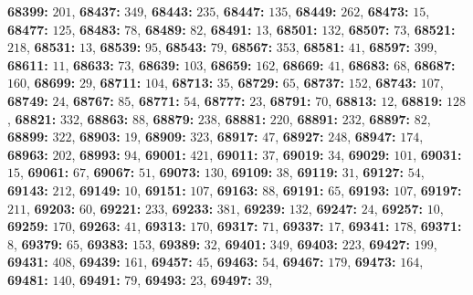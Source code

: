 \textsf{\bfseries 68399:} $201$, \textsf{\bfseries 68437:} $349$, \textsf{\bfseries 68443:} $235$, \textsf{\bfseries 68447:} $135$, \textsf{\bfseries 68449:} $262$, \textsf{\bfseries 68473:} $15$, \textsf{\bfseries 68477:} $125$, \textsf{\bfseries 68483:} $78$, \textsf{\bfseries 68489:} $82$, \textsf{\bfseries 68491:} $13$, \textsf{\bfseries 68501:} $132$, \textsf{\bfseries 68507:} $73$, \textsf{\bfseries 68521:} $218$, \textsf{\bfseries 68531:} $13$, \textsf{\bfseries 68539:} $95$, \textsf{\bfseries 68543:} $79$, \textsf{\bfseries 68567:} $353$, \textsf{\bfseries 68581:} $41$, \textsf{\bfseries 68597:} $399$, \textsf{\bfseries 68611:} $11$, \textsf{\bfseries 68633:} $73$, \textsf{\bfseries 68639:} $103$, \textsf{\bfseries 68659:} $162$, \textsf{\bfseries 68669:} $41$, \textsf{\bfseries 68683:} $68$, \textsf{\bfseries 68687:} $160$, \textsf{\bfseries 68699:} $29$, \textsf{\bfseries 68711:} $104$, \textsf{\bfseries 68713:} $35$, \textsf{\bfseries 68729:} $65$, \textsf{\bfseries 68737:} $152$, \textsf{\bfseries 68743:} $107$, \textsf{\bfseries 68749:} $24$, \textsf{\bfseries 68767:} $85$, \textsf{\bfseries 68771:} $54$, \textsf{\bfseries 68777:} $23$, \textsf{\bfseries 68791:} $70$, \textsf{\bfseries 68813:} $12$, \textsf{\bfseries 68819:} $128$, \textsf{\bfseries 68821:} $332$, \textsf{\bfseries 68863:} $88$, \textsf{\bfseries 68879:} $238$, \textsf{\bfseries 68881:} $220$, \textsf{\bfseries 68891:} $232$, \textsf{\bfseries 68897:} $82$, \textsf{\bfseries 68899:} $322$, \textsf{\bfseries 68903:} $19$, \textsf{\bfseries 68909:} $323$, \textsf{\bfseries 68917:} $47$, \textsf{\bfseries 68927:} $248$, \textsf{\bfseries 68947:} $174$, \textsf{\bfseries 68963:} $202$, \textsf{\bfseries 68993:} $94$, \textsf{\bfseries 69001:} $421$, \textsf{\bfseries 69011:} $37$, \textsf{\bfseries 69019:} $34$, \textsf{\bfseries 69029:} $101$, \textsf{\bfseries 69031:} $15$, \textsf{\bfseries 69061:} $67$, \textsf{\bfseries 69067:} $51$, \textsf{\bfseries 69073:} $130$, \textsf{\bfseries 69109:} $38$, \textsf{\bfseries 69119:} $31$, \textsf{\bfseries 69127:} $54$, \textsf{\bfseries 69143:} $212$, \textsf{\bfseries 69149:} $10$, \textsf{\bfseries 69151:} $107$, \textsf{\bfseries 69163:} $88$, \textsf{\bfseries 69191:} $65$, \textsf{\bfseries 69193:} $107$, \textsf{\bfseries 69197:} $211$, \textsf{\bfseries 69203:} $60$, \textsf{\bfseries 69221:} $233$, \textsf{\bfseries 69233:} $381$, \textsf{\bfseries 69239:} $132$, \textsf{\bfseries 69247:} $24$, \textsf{\bfseries 69257:} $10$, \textsf{\bfseries 69259:} $170$, \textsf{\bfseries 69263:} $41$, \textsf{\bfseries 69313:} $170$, \textsf{\bfseries 69317:} $71$, \textsf{\bfseries 69337:} $17$, \textsf{\bfseries 69341:} $178$, \textsf{\bfseries 69371:} $8$, \textsf{\bfseries 69379:} $65$, \textsf{\bfseries 69383:} $153$, \textsf{\bfseries 69389:} $32$, \textsf{\bfseries 69401:} $349$, \textsf{\bfseries 69403:} $223$, \textsf{\bfseries 69427:} $199$, \textsf{\bfseries 69431:} $408$, \textsf{\bfseries 69439:} $161$, \textsf{\bfseries 69457:} $45$, \textsf{\bfseries 69463:} $54$, \textsf{\bfseries 69467:} $179$, \textsf{\bfseries 69473:} $164$, \textsf{\bfseries 69481:} $140$, \textsf{\bfseries 69491:} $79$, \textsf{\bfseries 69493:} $23$, \textsf{\bfseries 69497:} $39$, 

